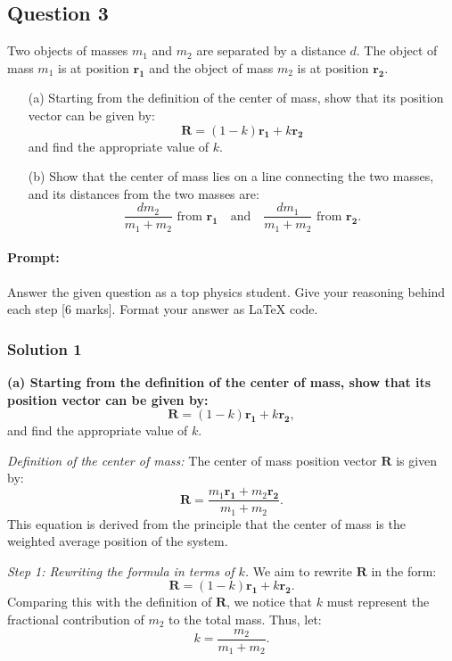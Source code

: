 \documentclass{article}
\begin{document}
\subsection{Question 3}

Two objects of masses $m_1$ and $m_2$ are separated by a distance $d$. The object of mass $m_1$ is at position $\mathbf{r_1}$ and the object of mass $m_2$ is at position $\mathbf{r_2}$.

\begin{itemize}
    \item[(a)] Starting from the definition of the center of mass, show that its position vector can be given by:
    \[
    \mathbf{R} = (1 - k)\mathbf{r_1} + k\mathbf{r_2}
    \]
    and find the appropriate value of $k$.
    
    \item[(b)] Show that the center of mass lies on a line connecting the two masses, and its distances from the two masses are:
    \[
    \frac{dm_2}{m_1 + m_2} \text{ from } \mathbf{r_1} \quad \text{and} \quad \frac{dm_1}{m_1 + m_2} \text{ from } \mathbf{r_2}.
    \]
\end{itemize}

\paragraph{Prompt: \\} 
Answer the given question as a top physics student. Give your reasoning behind each step [6 marks].
Format your answer as LaTeX code.

\subsubsection{Solution 1}
\textbf{(a) Starting from the definition of the center of mass, show that its position vector can be given by:}
\[
\mathbf{R} = (1 - k)\mathbf{r_1} + k\mathbf{r_2},
\]
and find the appropriate value of $k$.

\textit{Definition of the center of mass:}
The center of mass position vector $\mathbf{R}$ is given by:
\[
\mathbf{R} = \frac{m_1 \mathbf{r_1} + m_2 \mathbf{r_2}}{m_1 + m_2}.
\]
This equation is derived from the principle that the center of mass is the weighted average position of the system.

\textit{Step 1: Rewriting the formula in terms of $k$.}  
We aim to rewrite $\mathbf{R}$ in the form:
\[
\mathbf{R} = (1 - k)\mathbf{r_1} + k\mathbf{r_2}.
\]
Comparing this with the definition of $\mathbf{R}$, we notice that $k$ must represent the fractional contribution of $m_2$ to the total mass. Thus, let:
\[
k = \frac{m_2}{m_1 + m_2}.
\]
\end{document}
